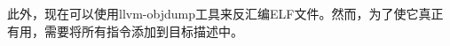 此外，现在可以使用llvm-objdump工具来反汇编ELF文件。然而，为了使它真正有用，需要将所有指令添加到目标描述中。



























































